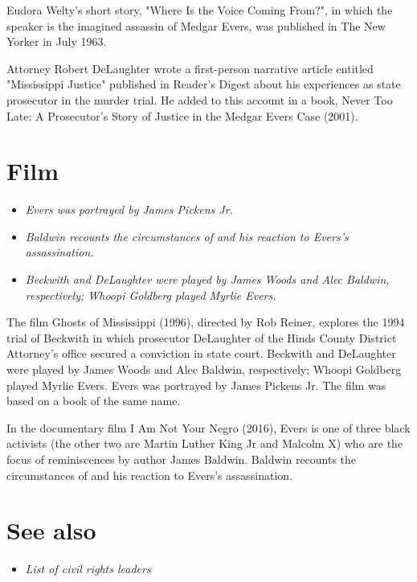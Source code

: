 Eudora Welty's short story, "Where Is the Voice Coming From?", in which
the speaker is the imagined assassin of Medgar Evers, was published in
The New Yorker in July 1963.

Attorney Robert DeLaughter wrote a first-person narrative article
entitled "Mississippi Justice" published in Reader's Digest about his
experiences as state prosecutor in the murder trial. He added to this
account in a book, Never Too Late: A Prosecutor's Story of Justice in
the Medgar Evers Case (2001).

\section{Film}\label{film}

\begin{itemize}
\item
  \emph{Evers was portrayed by James Pickens Jr.}
\item
  \emph{Baldwin recounts the circumstances of and his reaction to
  Evers's assassination.}
\item
  \emph{Beckwith and DeLaughter were played by James Woods and Alec
  Baldwin, respectively; Whoopi Goldberg played Myrlie Evers.}
\end{itemize}

The film Ghosts of Mississippi (1996), directed by Rob Reiner, explores
the 1994 trial of Beckwith in which prosecutor DeLaughter of the Hinds
County District Attorney's office secured a conviction in state court.
Beckwith and DeLaughter were played by James Woods and Alec Baldwin,
respectively; Whoopi Goldberg played Myrlie Evers. Evers was portrayed
by James Pickens Jr. The film was based on a book of the same name.

In the documentary film I Am Not Your Negro (2016), Evers is one of
three black activists (the other two are Martin Luther King Jr and
Malcolm X) who are the focus of reminiscences by author James Baldwin.
Baldwin recounts the circumstances of and his reaction to Evers's
assassination.

\section{See also}\label{see-also}

\begin{itemize}
\item
  \emph{List of civil rights leaders}
\end{itemize}


